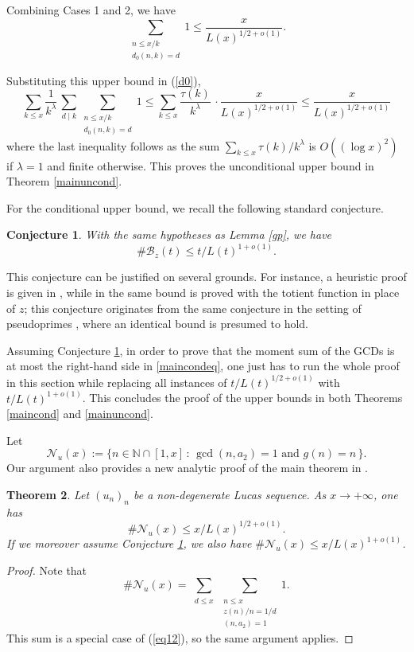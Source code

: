 \documentclass[12pt,a4paper,oneside]{amsart}
\newtheorem{theorem}{Theorem}[section]
\newtheorem{conjecture}[theorem]{Conjecture}
\begin{document}
\medskip

Combining Cases 1 and 2, we have  \[\sum_{\substack{n \le x/k\\ d_0(n,k)=d}}1\le\frac{x}{L(x)^{1/2+o(1)}}. \] 

Substituting this upper bound in (\ref{d0}),  \[\sum_{k \leq x} \frac{1}{k^\lambda}\, \sum_{d \mid k}\sum_{\substack{n \le x/k\\ d_0(n,k)=d}}1  \le \sum_{k \leq x} \frac{\tau(k)}{k^\lambda}\,\cdot\frac{x}{L(x)^{1/2+o(1)}} \le \frac{x}{L(x)^{1/2+o(1)}} \] where the last inequality follows as the sum $\sum_{k \leq x} {\tau(k)}/{k^\lambda}$ is $O((\log x)^2)$ if $\lambda=1$ and finite otherwise.
This proves the unconditional upper bound in Theorem \ref{mainuncond}.

\medskip


For the conditional upper bound, we recall the following standard conjecture.

\begin{conjecture}\label{conjgp}
With the same hypotheses as Lemma \ref{gp}, we have
\begin{equation}\label{pomeranceconj}\# \mathcal B_z(t) \leq t/L(t)^{1+o(1)}.\end{equation}
\end{conjecture}

This conjecture can be justified on several grounds. For instance, a heuristic proof is given in \cite[Th. 8.10]{Ze14}, while in \cite[\S 2]{Po80} the same bound is proved with the totient function in place of $z$; this conjecture originates from the same conjecture in the setting of pseudoprimes \cite{Po81}, where an identical bound is presumed to hold.

Assuming Conjecture \ref{conjgp}, in order to prove that the moment sum of the GCDs is at most the right-hand side in \eqref{maincondeq}, one just has to run the whole proof in this section while replacing all instances of $t/L(t)^{1/2+o(1)}$ with $t/L(t)^{1+o(1)}$. This concludes the proof of the upper bounds in both Theorems \ref{maincond} and \ref{mainuncond}. 

\medskip 

Let \[\mathcal{N}_u(x):=\{n\in \mathbb N\cap [1,x]\,:\, \gcd(n,a_2)=1\text{ and }g(n)=n\,\}.\] Our argument also provides a new analytic proof of the main theorem in \cite[Th. 1.2]{Sa17}.
\begin{theorem}\label{gordonupper}
Let $(u_n)_n$ be a non-degenerate Lucas sequence. As $x \to +\infty$, one has
\[ \#\mathcal{N}_{u}(x)\le x/L(x)^{1/2+o(1)}. \]
If we moreover assume Conjecture \ref{conjgp}, we also have $\#\mathcal{N}_{u}(x)\le x/L(x)^{1+o(1)}$.
\end{theorem}
\begin{proof}
Note that \[\#\mathcal{N}_u(x)=\sum_{\substack{d\le x }}\sum_{\substack{n \le x\\ z(n)/n = 1/d\\ (n,a_2)=1  }}1.\] This sum is a special case of (\ref{eq12}), so the same argument applies.
\end{proof}
\end{document}
